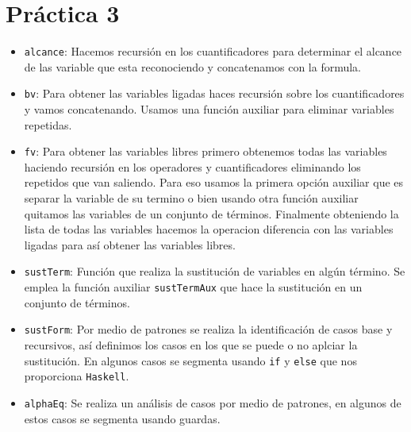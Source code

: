 \documentclass{article}
\newcommand{\code}[1]{\textcolor{white!25!black}{\texttt{#1}}}
\begin{document}
\section*{\LARGE{Práctica 3}}
\newcommand{\localtextbulletone}{\textcolor{black}{\raisebox{.45ex}{\rule{.6ex}{.6ex}}}}
\renewcommand{\labelitemi}{\localtextbulletone}
\begin{itemize}
    \item \code{alcance}: Hacemos recursión en los cuantificadores para determinar el alcance de las variable que esta reconociendo y concatenamos con la formula. 
  
    \item \code{bv}: Para obtener las variables ligadas haces recursión sobre los cuantificadores y vamos concatenando. Usamos una función auxiliar para eliminar variables repetidas. 
  
    \item \code{fv}: Para obtener las variables libres primero obtenemos todas las variables haciendo recursión en los operadores y cuantificadores eliminando los repetidos que van saliendo. Para eso usamos la primera opción auxiliar que es separar la variable de su termino o bien usando otra función auxiliar quitamos las variables de un conjunto de términos. Finalmente obteniendo la lista de todas las variables hacemos la operacion diferencia con las variables ligadas para así obtener las variables libres.
  
    \item \code{sustTerm}: Función que realiza la sustitución de variables en algún término.
    Se emplea la función auxiliar \code{sustTermAux} que hace la sustitución en un conjunto de términos.
  
    \item \code{sustForm}: Por medio de patrones se realiza la identificación de casos base y recursivos, así definimos los casos en los que se puede o no aplciar la sustitución.
    En algunos casos se segmenta usando \code{if} y \code{else} que nos proporciona \code{Haskell}.
  
    \item \code{alphaEq}: Se realiza un análisis de casos por medio de patrones, en algunos de estos casos se segmenta usando guardas.
\end{itemize}
\begin{center}
\end{center}
\end{document}
